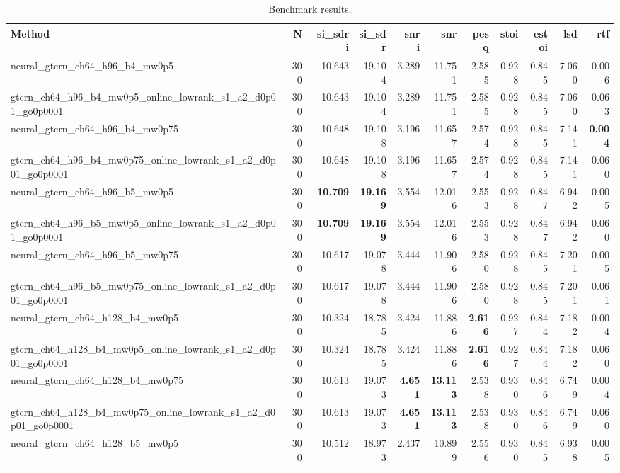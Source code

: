 \begin{table}[t]
\centering
\caption{Benchmark results.}
\label{tab:bench}
\begin{tabular}{lrrrrrrrrrr}
\toprule
Method & N & si\_sdr\_i & si\_sdr & snr\_i & snr & pesq & stoi & estoi & lsd & rtf \\
\midrule
neural_gtcrn_ch64_h96_b4_mw0p5 & 300 & 10.643 & 19.104 & 3.289 & 11.751 & 2.585 & 0.928 & 0.845 & 7.060 & 0.006 \\
gtcrn_ch64_h96_b4_mw0p5_online_lowrank_s1_a2_d0p01_go0p0001 & 300 & 10.643 & 19.104 & 3.289 & 11.751 & 2.585 & 0.928 & 0.845 & 7.060 & 0.063 \\
neural_gtcrn_ch64_h96_b4_mw0p75 & 300 & 10.648 & 19.108 & 3.196 & 11.657 & 2.574 & 0.928 & 0.845 & 7.141 & \textbf{0.004} \\
gtcrn_ch64_h96_b4_mw0p75_online_lowrank_s1_a2_d0p01_go0p0001 & 300 & 10.648 & 19.108 & 3.196 & 11.657 & 2.574 & 0.928 & 0.845 & 7.141 & 0.060 \\
neural_gtcrn_ch64_h96_b5_mw0p5 & 300 & \textbf{10.709} & \textbf{19.169} & 3.554 & 12.016 & 2.553 & 0.928 & 0.847 & 6.942 & 0.005 \\
gtcrn_ch64_h96_b5_mw0p5_online_lowrank_s1_a2_d0p01_go0p0001 & 300 & \textbf{10.709} & \textbf{19.169} & 3.554 & 12.016 & 2.553 & 0.928 & 0.847 & 6.942 & 0.060 \\
neural_gtcrn_ch64_h96_b5_mw0p75 & 300 & 10.617 & 19.078 & 3.444 & 11.906 & 2.580 & 0.928 & 0.845 & 7.201 & 0.005 \\
gtcrn_ch64_h96_b5_mw0p75_online_lowrank_s1_a2_d0p01_go0p0001 & 300 & 10.617 & 19.078 & 3.444 & 11.906 & 2.580 & 0.928 & 0.845 & 7.201 & 0.061 \\
neural_gtcrn_ch64_h128_b4_mw0p5 & 300 & 10.324 & 18.785 & 3.424 & 11.886 & \textbf{2.616} & 0.927 & 0.844 & 7.182 & 0.004 \\
gtcrn_ch64_h128_b4_mw0p5_online_lowrank_s1_a2_d0p01_go0p0001 & 300 & 10.324 & 18.785 & 3.424 & 11.886 & \textbf{2.616} & 0.927 & 0.844 & 7.182 & 0.060 \\
neural_gtcrn_ch64_h128_b4_mw0p75 & 300 & 10.613 & 19.073 & \textbf{4.651} & \textbf{13.113} & 2.538 & 0.930 & 0.846 & 6.749 & 0.004 \\
gtcrn_ch64_h128_b4_mw0p75_online_lowrank_s1_a2_d0p01_go0p0001 & 300 & 10.613 & 19.073 & \textbf{4.651} & \textbf{13.113} & 2.538 & 0.930 & 0.846 & 6.749 & 0.060 \\
neural_gtcrn_ch64_h128_b5_mw0p5 & 300 & 10.512 & 18.973 & 2.437 & 10.899 & 2.556 & 0.930 & 0.845 & 6.938 & 0.005 \\

\end{tabular}
\end{table}
